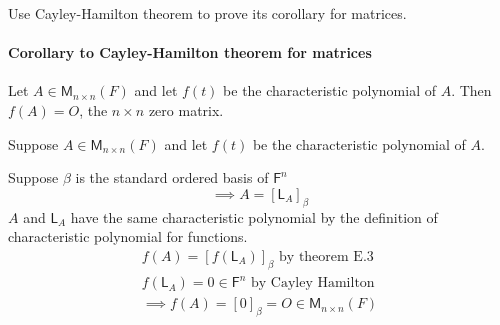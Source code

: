 Use Cayley-Hamilton theorem to prove its corollary for matrices. 

\paragraph{Corollary to Cayley-Hamilton theorem for matrices} Let $A
\in \mathsf{M}_{n\times n}(F)$ and let $f(t)$ be the characteristic
polynomial of $A.$ Then $f(A) = O$, the $n\times n$ zero matrix.

Suppose $A \in \mathsf{M}_{n \times n}(F)$ and let $f(t)$ be the characteristic
polynomial of $A.$

Suppose $\beta$ is the standard ordered basis of $\mathsf{F}^n$
\begin{equation}
\implies A = [\mathsf{L}_A]_\beta
\end{equation}
$A$ and $\mathsf{L}_A$ have the same characteristic polynomial by the
definition of characteristic polynomial for functions.
\begin{gather}
f(A) = \left[f(\mathsf{L}_A)\right]_\beta \text{ by theorem E.3}\\
f(\mathsf{L}_A) = 0 \in \mathsf{F}^n \text{ by Cayley Hamilton}\\
\implies f(A) = \left[0\right]_\beta = O \in \mathsf{M}_{n \times n}(F)
\end{gather}
